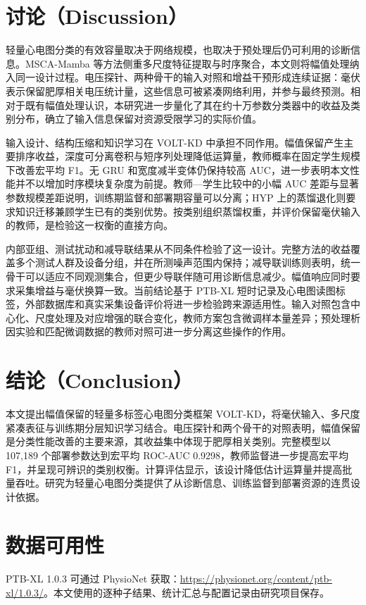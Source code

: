 \documentclass[11pt,a4paper,UTF8,fontset=windows]{ctexart}
\begin{document}
\section{讨论（Discussion）}
轻量心电图分类的有效容量取决于网络规模，也取决于预处理后仍可利用的诊断信息。MSCA-Mamba 等方法侧重多尺度特征提取与时序聚合\cite{cetintas2026}，本文则将幅值处理纳入同一设计过程。电压探针、两种骨干的输入对照和增益干预形成连续证据：毫伏表示保留肥厚相关电压统计量，这些信息可被紧凑网络利用，并参与最终预测。相对于既有幅值处理认识\cite{nolin2026}，本研究进一步量化了其在约十万参数分类器中的收益及类别分布，确立了输入信息保留对资源受限学习的实际价值。

输入设计、结构压缩和知识学习在 VOLT-KD 中承担不同作用。幅值保留产生主要排序收益，深度可分离卷积与短序列处理降低运算量，教师概率在固定学生规模下改善宏平均 F1。无 GRU 和宽度减半变体仍保持较高 AUC，进一步表明本文性能并不以增加时序模块复杂度为前提。教师—学生比较中的小幅 AUC 差距与显著参数规模差距说明，训练期监督和部署期容量可以分离；HYP 上的蒸馏退化则要求知识迁移兼顾学生已有的类别优势。按类别组织蒸馏权重，并评价保留毫伏输入的教师，是检验这一权衡的直接方向。

内部亚组、测试扰动和减导联结果从不同条件检验了这一设计。完整方法的收益覆盖多个测试人群及设备分组，并在所测噪声范围内保持；减导联训练则表明，统一骨干可以适应不同观测集合，但更少导联伴随可用诊断信息减少。幅值响应同时要求采集增益与毫伏换算一致。当前结论基于 PTB-XL 短时记录及心电图读图标签，外部数据库和真实采集设备评价将进一步检验跨来源适用性。输入对照包含中心化、尺度处理及对应增强的联合变化，教师方案包含微调样本量差异；预处理析因实验和匹配微调数据的教师对照可进一步分离这些操作的作用。

\section{结论（Conclusion）}
本文提出幅值保留的轻量多标签心电图分类框架 VOLT-KD，将毫伏输入、多尺度紧凑表征与训练期分层知识学习结合。电压探针和两个骨干的对照表明，幅值保留是分类性能改善的主要来源，其收益集中体现于肥厚相关类别。完整模型以 107,189 个部署参数达到宏平均 ROC-AUC 0.9298，教师监督进一步提高宏平均 F1，并呈现可辨识的类别权衡。计算评估显示，该设计降低估计运算量并提高批量吞吐。研究为轻量心电图分类提供了从诊断信息、训练监督到部署资源的连贯设计依据。

\section*{数据可用性}
PTB-XL 1.0.3 可通过 PhysioNet 获取：\url{https://physionet.org/content/ptb-xl/1.0.3/}。本文使用的逐种子结果、统计汇总与配置记录由研究项目保存。
\end{document}
